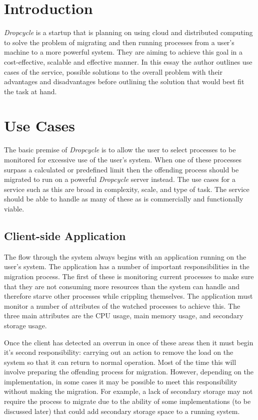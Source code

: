 \documentclass[12pt, a4paper]{article}
\title{\thetitle}
\author{\theauthor}
\date{\today}
\begin{document}
\maketitle
\thispagestyle{empty}

\section{Introduction}

\emph{Dropcycle} is a startup that is planning on using cloud and distributed
computing to solve the problem of migrating and then running processes from
a user's machine to a more powerful system. They are aiming to achieve this
goal in a cost-effective, scalable and effective manner. In this essay the
author outlines use cases of the service, possible solutions to the overall
problem with their advantages and disadvantages before outlining the solution
that would best fit the task at hand.

\section{Use Cases}

The basic premise of \emph{Dropcycle} is to allow the user to select processes
to be monitored for excessive use of the user's system. When one of these
processes surpass a calculated or predefined limit then the offending process
should be migrated to run on a powerful \emph{Dropcycle} server instead. The
use cases for a service such as this are broad in complexity, scale, and type
of task. The service should be able to handle as many of these as is
commercially and functionally viable.

\subsection{Client-side Application}

The flow through the system always begins with an application running on the
user's system. The application has a number of important responsibilities in
the migration process. The first of these is monitoring current processes to
make sure that they are not consuming more resources than the system can handle
and therefore starve other processes while crippling themselves. The
application must monitor a number of attributes of the watched processes to
achieve this. The three main attributes are the CPU usage, main memory usage,
and secondary storage usage.

Once the client has detected an overrun in once of these areas then it must
begin it's second responsibility: carrying out an action to remove the load on
the system so that it can return to normal operation. Most of the time this
will involve preparing the offending process for migration. However, depending
on the implementation, in some cases it may be possible to meet this
responsibility without making the migration. For example, a lack of secondary
storage may not require the process to migrate due to the ability of some
implementations (to be discussed later) that could add secondary storage space
to a running system.
\end{document}
